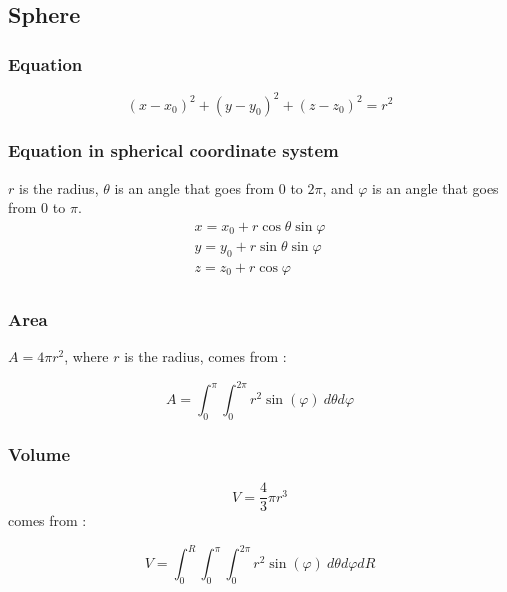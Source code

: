 \subsection{Sphere}

\subsubsection{Equation}

    \[
        (x - x_0)^2 + (y - y_0)^2 + (z - z_0)^2 = r^2
    \]

\subsubsection{Equation in spherical coordinate system}
  $r$ is the radius, $\theta$ is an angle that goes from $0$ to $2\pi$, and $\varphi$ is an angle that goes from $0$ to  $\pi$.
  \[
    \begin{array}{l}
        x = x_0 + r\cos \theta\sin \varphi \\
        y = y_0 + r\sin \theta\sin \varphi \\
        z = z_0 + r\cos \varphi \\
    \end{array}
  \]


\subsubsection{Area}

  $A = 4\pi r^2$, where $r$ is the radius, comes from :

  \[
      A = \int_0^\pi \int_0^{2\pi} r^2\sin(\varphi)\ d\theta d\varphi
  \]
\subsubsection{Volume}

        \[
            V = \frac{4}{3}\pi r^3
        \]
        comes from :

        \[
            V = \int_0^R \int_0^\pi \int_0^{2\pi} r^2\sin(\varphi)\ d\theta d\varphi dR
        \]



